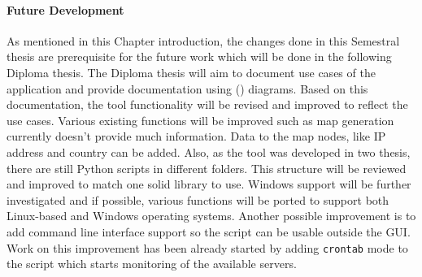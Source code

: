 \paragraph{Future Development}
As mentioned in this Chapter introduction, the changes done in this Semestral thesis are prerequisite for the future work which will be done in the following Diploma thesis. The Diploma thesis will aim to document use cases of the application and provide documentation using  () diagrams. Based on this documentation, the tool functionality  will be revised and improved to reflect the use cases. Various existing functions will be improved such as map generation currently doesn't provide much information. Data to the map nodes, like IP address and country can be added. Also, as the tool was developed in two thesis, there are still Python scripts in different folders. This structure will be reviewed and improved to match one solid library to use. Windows support will be further investigated and if possible, various functions will be ported to support both Linux-based and Windows operating systems. Another possible improvement is to add command line interface support so the script can be usable outside the GUI. Work on this improvement has been already started by adding \texttt{crontab} mode to the script which starts monitoring of the available servers. 